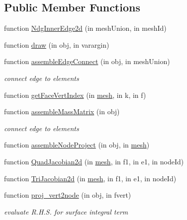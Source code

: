 \subsection*{Public Member Functions}
\begin{DoxyCompactItemize}
\item 
function \hyperlink{class_ndg_inner_edge2d_a4fdd7dc9fd7f346d3728496e82103452}{Ndg\+Inner\+Edge2d} (in mesh\+Union, in mesh\+Id)
\item 
function \hyperlink{class_ndg_inner_edge2d_a7ffeb42b307c5232b5e2b8b54be56c52}{draw} (in obj, in varargin)
\item 
function \hyperlink{class_ndg_inner_edge2d_a0a6eb2a29324df1abf4343fde66dbd51}{assemble\+Edge\+Connect} (in obj, in mesh\+Union)
\begin{DoxyCompactList}\small\item\em connect edge to elements \end{DoxyCompactList}\item 
function \hyperlink{class_ndg_inner_edge2d_a2690762ea2c380ff87634895de75bb93}{get\+Face\+Vert\+Index} (in \hyperlink{class_ndg_inner_edge_a703bdf93b4da38294056ccc9e4042491}{mesh}, in k, in f)
\item 
function \hyperlink{class_ndg_inner_edge2d_ace3ef04bec05392cf51110e479a0b15f}{assemble\+Mass\+Matrix} (in obj)
\begin{DoxyCompactList}\small\item\em connect edge to elements \end{DoxyCompactList}\item 
function \hyperlink{class_ndg_inner_edge2d_a65d0ed80b119a72dbd1c3fc4e0f7724c}{assemble\+Node\+Project} (in obj, in \hyperlink{class_ndg_inner_edge_a703bdf93b4da38294056ccc9e4042491}{mesh})
\item 
function \hyperlink{class_ndg_inner_edge2d_a726931cfbe0eda4d198a0c9a0cdd286a}{Quad\+Jacobian2d} (in \hyperlink{class_ndg_inner_edge_a703bdf93b4da38294056ccc9e4042491}{mesh}, in f1, in e1, in node\+Id)
\item 
function \hyperlink{class_ndg_inner_edge2d_abf1a7ff671f85b2b6294b95ddd3a09d8}{Tri\+Jacobian2d} (in \hyperlink{class_ndg_inner_edge_a703bdf93b4da38294056ccc9e4042491}{mesh}, in f1, in e1, in node\+Id)
\item 
function \hyperlink{class_ndg_inner_edge2d_a3a668ca5888f252d853568a02ab3ecc7}{proj\+\_\+vert2node} (in obj, in fvert)
\begin{DoxyCompactList}\small\item\em evaluate R.\+H.\+S. for surface integral term \end{DoxyCompactList}\end{DoxyCompactItemize}
